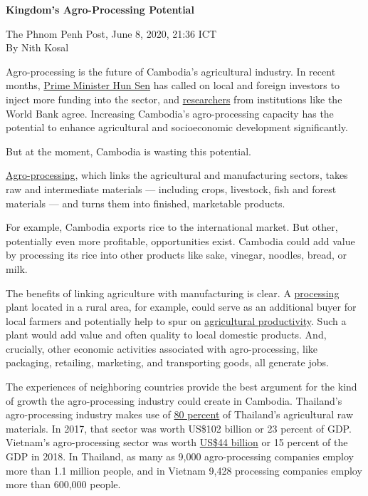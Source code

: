 \documentclass[10pt,a4paper]{letter}
\begin{document}
{\Large 
	\textbf{Kingdom's Agro-Processing Potential}
} 

The Phnom Penh Post, June 8, 2020, 21:36 ICT \\
By Nith Kosal

Agro-processing is the future of Cambodia's agricultural industry. In recent months, \href{https://www.khmertimeskh.com/50686215/demand-to-modernise-agriculture}{Prime Minister Hun Sen} has called on local and foreign investors to inject more funding into the sector, and \href{https://www.worldbank.org/en/country/cambodia/publication/cambodian-agriculture-in-transition-opportunities-and-risks}{researchers} from institutions like the World Bank agree. Increasing Cambodia's agro-processing capacity has the potential to enhance agricultural and socioeconomic development significantly.

But at the moment, Cambodia is wasting this potential. 

\href{https://www.agriculturenigeria.com/processing/agro-processing/}{Agro-processing}, which links the agricultural and manufacturing sectors, takes raw and intermediate materials --- including crops, livestock, fish and forest materials --- and turns them into finished, marketable products.

For example, Cambodia exports rice to the international market. But other, potentially even more profitable, opportunities exist. Cambodia could add value by processing its rice into other products like sake, vinegar, noodles, bread, or milk.

The benefits of linking agriculture with manufacturing is clear. A \href{https://www.researchgate.net/publication/323749975_Structural_transformation_in_agriculture_and_agro-processing_value_chains}{processing} plant located in a rural area, for example, could serve as an additional buyer for local farmers and potentially help to spur on \href{http://acetforafrica.org/acet/wp-content/uploads/publications/2017/10/ATR17-overview-english-for-web-0911.pdf}{agricultural productivity}. Such a plant would add value and often quality to local domestic products. And, crucially, other economic activities associated with agro-processing, like packaging, retailing, marketing, and transporting goods, all generate jobs.

The experiences of neighboring countries provide the best argument for the kind of growth the agro-processing industry could create in Cambodia. Thailand's agro-processing industry makes use of \href{http://www.boi.go.th/upload/content/Food%20industry_5aa7b40bd758b.pdf}{80 percent} of Thailand's agricultural raw materials. In 2017, that sector was worth US\$102 billion or 23 percent of GDP. Vietnam's agro-processing sector was worth \href{https://www.fas.usda.gov/data/vietnam-food-processing-ingredients-2}{US\$44 billion} or 15 percent of the GDP in 2018. In Thailand, as many as 9,000 agro-processing companies employ more than 1.1 million people, and in Vietnam 9,428 processing companies employ more than 600,000 people.
\end{document}
